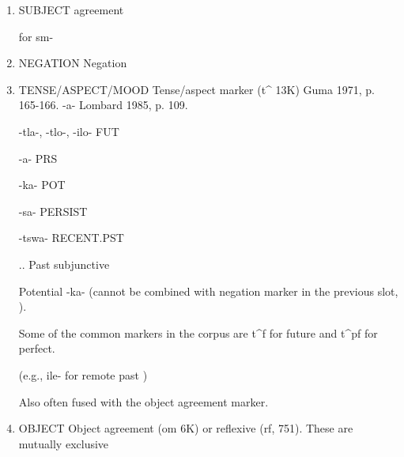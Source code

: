 \documentclass[11pt,letterpaper]{article}
\begin{document}
\begin{enumerate}


    \item SUBJECT agreement
    
    
    \cite[]{doke1967textbook} for sm-
    
    \item NEGATION Negation 
    
    
    \item TENSE/ASPECT/MOOD Tense/aspect marker (t\^{} 13K) Guma 1971, p. 165-166. -a- Lombard 1985, p. 109.
    
    -tla-, -tlo-, -ilo- FUT \cite[]{doke1967textbook}
    
    -a- PRS \cite[]{doke1967textbook}
    
    -ka- POT \cite[]{doke1967textbook}
    
    -sa- PERSIST \cite[]{doke1967textbook}
    
    -tswa- RECENT.PST \cite[]{doke1967textbook} 
    
    ..
    Past subjunctive
    
    
    Potential -ka- (cannot be combined with negation marker in the previous slot, \cite[]{doke1967textbook}).
    
    
    Some of the common markers in the corpus are t\^{}f for future and t\^{}pf for perfect.
    
    (e.g., ile- for remote past \cite[]{doke1967textbook})
    
    Also often fused with the object agreement marker.
    
    
    \item OBJECT Object agreement (om 6K) or reflexive (rf, 751). These are mutually exclusive \cite[p. 165]{guma1971handbook}
\end{enumerate}
\end{document}
